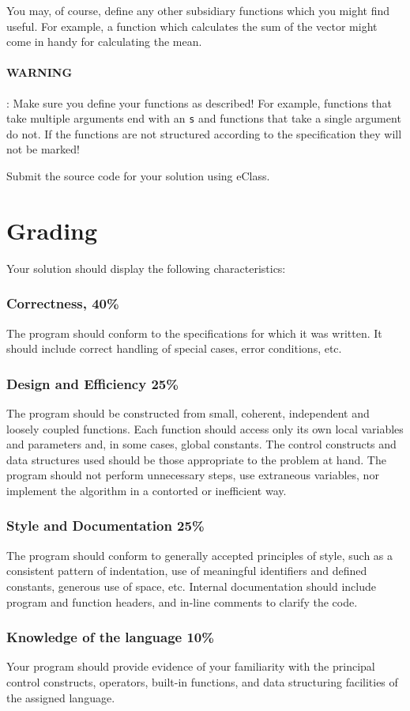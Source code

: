 \documentclass[12pt,info]{asg}
\begin{document}
You may, of course, define any other subsidiary functions which you might find useful. For example, a function which calculates the sum of the vector might come in handy for calculating the mean.

\paragraph{WARNING}: Make sure you define your functions as described! For example, functions that take multiple arguments end with an \texttt{s} and functions that take a single argument do not. If the functions are not structured according to the specification they will not be marked!

Submit the source code for your solution using eClass.

\section*{Grading}
Your solution should display the following characteristics:
\subsubsection*{Correctness, 40\%}
The program should conform to the specifications for which it was written. It should include correct handling of special cases, error conditions, etc.
\subsubsection*{Design and Efficiency 25\%} The program should be constructed from small, coherent, independent and loosely coupled functions. Each function should access only its own local variables and parameters and, in some cases, global constants. The control constructs and data structures used should be those appropriate to the problem at hand. The program should not perform unnecessary steps, use extraneous variables, nor implement the algorithm in a contorted or inefficient way.
\subsubsection*{Style and Documentation 25\%} The program should conform to generally accepted principles of style, such as a consistent pattern of indentation, use of meaningful identifiers and defined constants, generous use of space, etc. Internal documentation should include program and function headers, and in-line comments to clarify the code.
\subsubsection*{Knowledge of the language 10\%} Your program should provide evidence of your familiarity with the principal control constructs, operators, built-in functions, and data structuring facilities of the assigned language. 
\end{document}
